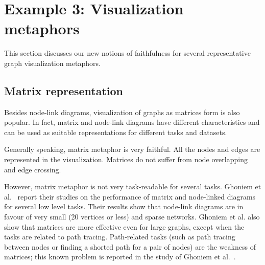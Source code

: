 \documentclass[10pt,journal,cspaper,compsoc]{IEEEtran}
\begin{document}


\section{Example 3: Visualization metaphors\label{sec:vizmetaphors}}
This section discusses our new notions of faithfulness for several representative graph visualization metaphors.

\subsection{Matrix representation}
Besides node-link diagrams, visualization of graphs as matrices form is also popular. In fact, matrix and node-link diagrams have different characteristics and can be used as suitable representations for different tasks and datasets.

Generally speaking, matrix metaphor is very faithful. All the nodes and edges are represented in the visualization. Matrices do not suffer from node overlapping and edge crossing.


However, matrix metaphor is not very task-readable for several tasks. 
Ghoniem et al.~\cite{ghoniem2005readability} report their studies on the performance of matrix and node-linked diagrams for several low level tasks. Their results show that node-link diagrams are in favour of very small (20 vertices or less) and sparse networks. Ghoniem et al. also show that matrices are more effective even for large graphs, except when the tasks are related to path tracing. Path-related tasks (such as path tracing between nodes or finding a shorted path for a pair of nodes) are the weakness of matrices; this known problem is reported  in the study of Ghoniem et al.~\cite{ghoniem2005readability}.
\end{document}
